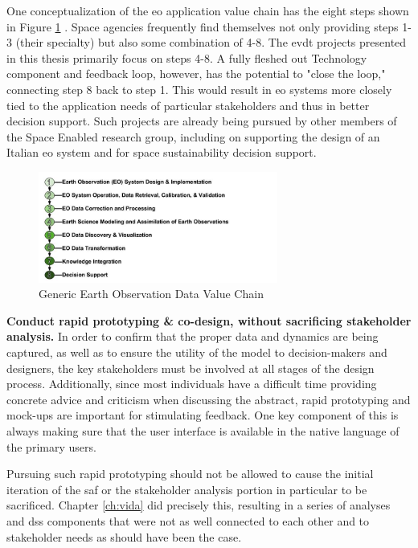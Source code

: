 One conceptualization of the \ac{eo} application value chain has the eight steps shown in Figure \ref{fig:eochain}  \cite{hakimdavarTransboundaryWaterImproving2018, woodPartnershipsEnableEarth2017}. Space agencies frequently find themselves not only providing steps 1-3 (their specialty) but also some combination of 4-8. The \ac{evdt} projects presented in this thesis primarily focus on steps 4-8. A fully fleshed out Technology component and feedback loop, however, has the potential to "close the loop," connecting step 8 back to step 1. This would result in \ac{eo} systems more closely tied to the application needs of particular stakeholders and thus in better decision support. Such projects are already being pursued by other members of the Space Enabled research group, including on supporting the design of an Italian \ac{eo} system and for space sustainability decision support.

\begin{figure}[ht]
    \centering
    \includegraphics[width=0.7\textwidth]{Figures/chap7/EOChain.jpg}
    \caption{Generic Earth Observation Data Value Chain}
    \label{fig:eochain}
\end{figure}

\textbf{Conduct rapid prototyping \& co-design, without sacrificing stakeholder analysis.} In order to confirm that the proper data and dynamics are being captured, as well as to ensure the utility of the model to decision-makers and designers, the key stakeholders must be involved at all stages of the design process. Additionally, since most individuals have a difficult time providing concrete advice and criticism when discussing the abstract, rapid prototyping and mock-ups are important for stimulating feedback. One key component of this is always making sure that the user interface is available in the native language of the primary users.

Pursuing such rapid prototyping should not be allowed to cause the initial iteration of the \ac{saf} or the stakeholder analysis portion in particular to be sacrificed. Chapter \ref{ch:vida} did precisely this, resulting in a series of analyses and \ac{dss} components that were not as well connected to each other and to stakeholder needs as should have been the case.

